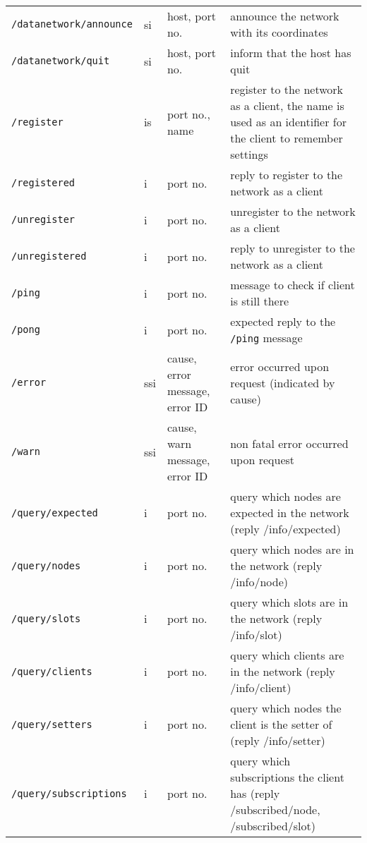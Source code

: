 \documentclass[letterpaper,10pt]{article}
\begin{document}
\begin{sidewaystable}[!tbp]
\small
\begin{center}
\begin{tabular}{|llll|}
\hline
\verb|/datanetwork/announce| & si & host, port no. & announce the network with its coordinates \\
\verb|/datanetwork/quit| & si & host, port no. & inform that the host has quit \\

\verb|/register| & is & port no., name & register to the network as a client, the name is used as an identifier for the client to remember settings \\
\verb|/registered| & i & port no. & reply to register to the network as a client \\

\verb|/unregister| & i & port no. & unregister to the network as a client \\  
\verb|/unregistered| & i & port no. & reply to unregister to the network as a client \\

\verb|/ping| & i & port no. &  message to check if client is still there \\
\verb|/pong| & i & port no. &  expected reply to the \verb|/ping| message \\

\verb|/error| & ssi & cause, error message, error ID & error occurred upon request (indicated by cause) \\
\verb|/warn| & ssi & cause, warn message, error ID & non fatal error occurred upon request \\  

\verb|/query/expected| & i & port no.& query which nodes are expected in the network (reply /info/expected) \\
\verb|/query/nodes| & i & port no.& query which nodes are in the network (reply /info/node) \\
\verb|/query/slots| & i & port no.& query which slots are in the network (reply /info/slot)\\
\verb|/query/clients| & i & port no.& query which clients are in the network (reply /info/client)\\
\verb|/query/setters| & i & port no.& query which nodes the client is the setter of (reply /info/setter) \\
\verb|/query/subscriptions| & i & port no.& query which subscriptions the client has (reply /subscribed/node, /subscribed/slot)\\


\end{tabular}
\end{center}
\end{sidewaystable}
\end{document}

